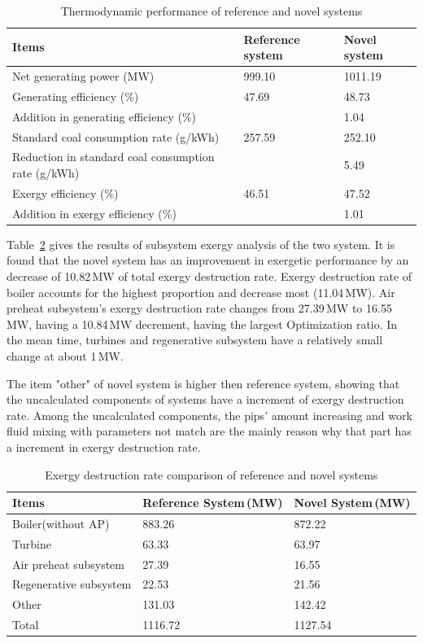 \documentclass[preprint,12pt]{elsarticle}
\begin{document}
\begin{table}
\caption{Thermodynamic performance of reference and novel systems}
\label{table:thermal performance compare}
\centering
\begin{tabular}{p{7.5cm}p{1.75cm}p{1.75cm}}
\toprule 
Items & Reference system & Novel system\tabularnewline
\midrule
Net generating power (MW) & 999.10 & 1011.19\tabularnewline
Generating efficiency (\%) & 47.69 & 48.73\tabularnewline
Addition in generating efficiency (\%) &  & 1.04\tabularnewline
Standard coal consumption rate (g/kWh) & 257.59 & 252.10\tabularnewline
Reduction in standard coal consumption rate (g/kWh) &  & 5.49\tabularnewline
Exergy efficiency (\%) & 46.51 & 47.52\tabularnewline
Addition in exergy efficiency (\%) &  & 1.01\tabularnewline
\bottomrule
\end{tabular}
\end{table}
Table~\ref{table:system exergy campare} gives the results of subsystem exergy analysis of the two system. 
It is found that the novel system has an improvement in exergetic performance by an decrease of 10.82\,MW of total exergy destruction rate.
Exergy destruction rate of boiler accounts for the highest proportion and decrease most (11.04\,MW).
Air preheat subsystem's exergy destruction rate changes from 27.39\,MW to 16.55\,MW, having a 10.84\,MW decrement, having the largest Optimization ratio.
In the mean time, turbines and regenerative subsystem have a relatively small change at about 1\,MW. 

The item "other" of novel system is higher then reference system, showing that the uncalculated components of systems have a increment of exergy destruction rate.
Among the uncalculated components, the pips' amount increasing and work fluid mixing with parameters not match are the mainly reason why that part has a increment in exergy destruction rate.

\begin{table}
\caption{Exergy destruction rate comparison of reference and novel systems }
\label{table:system exergy campare}
\centering
\begin{tabular}{lll}
\toprule 
Items & Reference System\,(MW) & Novel System\,(MW)\tabularnewline
\midrule 
Boiler(without AP) & 883.26 & 872.22\tabularnewline
Turbine & 63.33 & 63.97\tabularnewline
Air preheat subsystem  & 27.39 & 16.55\tabularnewline
Regenerative subsystem & 22.53 & 21.56\tabularnewline
Other & 131.03 & 142.42 \tabularnewline
Total & 1116.72 & 1127.54\tabularnewline
\bottomrule
\end{tabular}
\end{table}
\end{document}
